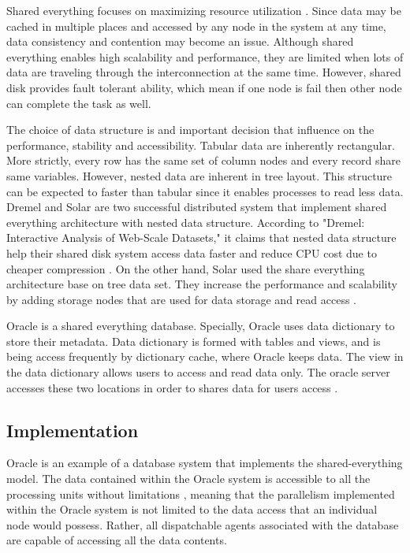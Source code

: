 \documentclass[onecolumn, draftclsnofoot,10pt, compsoc]{IEEEtran}
\begin{document}
Shared everything focuses on maximizing resource utilization \cite{ClaussenBestofBoth}. 
Since data may be cached in multiple places and accessed by any node in the system at any time, data consistency and contention may become an issue.
Although shared everything enables high scalability and performance, they are limited when lots of data are traveling through the interconnection at the same time. 
However, shared disk provides fault tolerant ability, which mean if one node is fail then other node can complete the task as well.  

The choice of data structure is and important decision that influence on the performance, stability and accessibility.
Tabular data are inherently rectangular.
More strictly, every row has the same set of column nodes and every record share same variables.
However, nested data are inherent in tree layout.
This structure can be expected to faster than tabular since it enables processes to read less data.
Dremel and Solar are two successful distributed system that implement shared everything architecture with nested data structure.
According to "Dremel: Interactive Analysis of Web-Scale Datasets," it claims that nested data structure help their shared disk system access data faster and reduce CPU cost due to cheaper compression \cite{Dremel}.
On the other hand, Solar used the share everything architecture base on tree data set.
They increase the performance and scalability by adding storage nodes that are used for data storage and read access \cite{zhu2018solar}.  

  Oracle is a shared everything database.
  Specially, Oracle uses data dictionary to store their metadata. 
  Data dictionary is formed with tables and views, and is being access frequently by dictionary cache, where Oracle keeps data. 
  The view in the data dictionary allows users to access and read data only.
  The oracle server accesses these two locations in order to shares data for users access \cite{OracleDataDictionary}.

    \subsection{Implementation}
Oracle is an example of a database system that implements the shared-everything model.
The data contained within the Oracle system is accessible to all the processing units without limitations \cite{OraclePEwODF}, meaning that the parallelism implemented within the Oracle system is not limited to the data access that an individual node would possess.
Rather, all dispatchable agents associated with the database are capable of accessing all the data contents.
\end{document}
